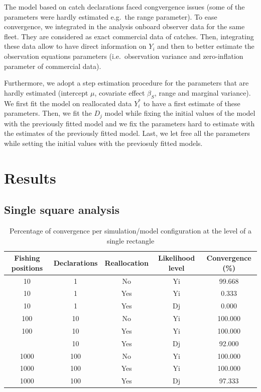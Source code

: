 \documentclass[
  english,
  man]{apa6}
\begin{document}
The model based on catch declarations faced congvergence issues (some of the parameters were hardly estimated e.g.~the range parameter). To ease convergence, we integrated in the analysis onboard observer data for the same fleet. They are considered as exact commercial data of catches. Then, integrating these data allow to have direct information on \(Y_i\) and then to better estimate the observation equations parameters (i.e.~observation variance and zero-inflation parameter of commercial data).

Furthermore, we adopt a step estimation procedure for the parameters that are hardly estimated (intercept \(\mu\), covariate effect \(\beta_S\), range and marginal variance). We first fit the model on reallocated data \(Y_i^*\) to have a first estimate of these parameters. Then, we fit the \(D_j\) model while fixing the initial values of the model with the previously fitted model and we fix the parameters hard to estimate with the estimates of the previously fitted model. Last, we let free all the parameters while setting the initial values with the previosuly fitted models.

\hypertarget{results}{%
\section{Results}\label{results}}

\hypertarget{single-square-analysis}{%
\subsection{Single square analysis}\label{single-square-analysis}}

\begin{table}

\caption{\label{tab:unnamed-chunk-2}Percentage of convergence per simulation/model configuration at the level of a single rectangle}
\centering
\begin{tabular}[t]{ccccc}
\toprule
Fishing positions & Declarations & Reallocation & Likelihood level & Convergence (\%)\\
\midrule
10 & 1 & No & Yi & 99.668\\
10 & 1 & Yes & Yi & 0.333\\
10 & 1 & Yes & Dj & 0.000\\
100 & 10 & No & Yi & 100.000\\
100 & 10 & Yes & Yi & 100.000\\
\addlinespace
100 & 10 & Yes & Dj & 92.000\\
1000 & 100 & No & Yi & 100.000\\
1000 & 100 & Yes & Yi & 100.000\\
1000 & 100 & Yes & Dj & 97.333\\
\bottomrule
\end{tabular}
\end{table}
\end{document}
